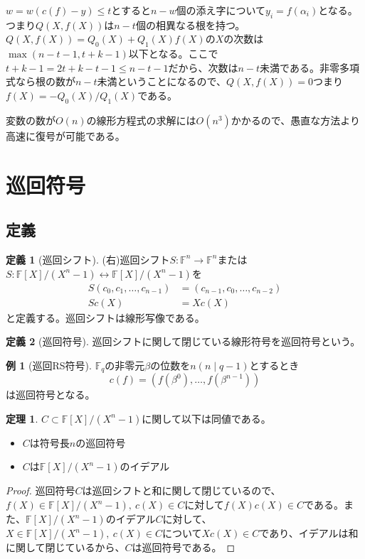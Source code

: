 \documentclass{jsarticle}
\newcommand{\F}{\mathbb{F}}
\renewcommand{\(}{\left(}
\renewcommand{\)}{\right)}
\theoremstyle{definition}
\newtheorem{dfn}{定義}
\newtheorem{thm}{定理}
\newtheorem{ex}{例}
\begin{document}
$w = w(c(f) - y) \leq t$とすると$n - w$個の添え字について$y_i = f(\alpha_i)$となる。つまり$Q(X, f(X))$は$n - t$個の相異なる根を持つ。$Q(X, f(X)) = Q_0(X) + Q_1(X)f(X)$の$X$の次数は$\max(n-t-1, t + k-1)$以下となる。ここで$t + k-1 = 2t + k - t-1 \leq n-t-1$だから、次数は$n - t$未満である。非零多項式なら根の数が$n - t$未満ということになるので、$Q(X, f(X)) = 0$つまり$f(X) = -Q_0(X) / Q_1(X)$である。

変数の数が$O(n)$の線形方程式の求解には$O(n^3)$かかるので、愚直な方法より高速に復号が可能である。

\section{巡回符号}

\subsection{定義}

\begin{dfn}[巡回シフト]
    (右)巡回シフト$S: \F^n \rightarrow \F^n$または$S: \F[X] / (X^n - 1) \leftrightarrow \F[X] / (X^n - 1)$を
    \begin{align*}
        S(c_0, c_1, \dots, c_{n-1}) &= (c_{n-1}, c_0, \dots, c_{n-2})\\
        Sc(X) &= Xc(X)
    \end{align*}
    と定義する。巡回シフトは線形写像である。
\end{dfn}

\begin{dfn}[巡回符号]
    巡回シフトに関して閉じている線形符号を巡回符号という。
\end{dfn}

\begin{ex}[巡回RS符号]
    $\F_q$の非零元$\beta$の位数を$n(n \mid q - 1)$とするとき
        \[c(f) = (f(\beta^0), \dots, f(\beta^{n-1}))\]
    は巡回符号となる。
\end{ex}

\begin{thm}
    $C \subset \F[X] / (X^n - 1)$に関して以下は同値である。
    \begin{itemize}
        \item $C$は符号長$n$の巡回符号
        \item $C$は$\F[X] / (X^n - 1)$のイデアル
    \end{itemize}
\end{thm}
\begin{proof}
    巡回符号$C$は巡回シフトと和に関して閉じているので、$f(X) \in \F[X] / (X^n - 1),\ c(X) \in C$に対して$f(X)c(X) \in C$である。また、$\F[X] / (X^n - 1)$のイデアル$C$に対して、$X \in \F[X] / (X^n - 1),\ c(X) \in C$について$Xc(X) \in C$であり、イデアルは和に関して閉じているから、$C$は巡回符号である。
\end{proof}
\end{document}
